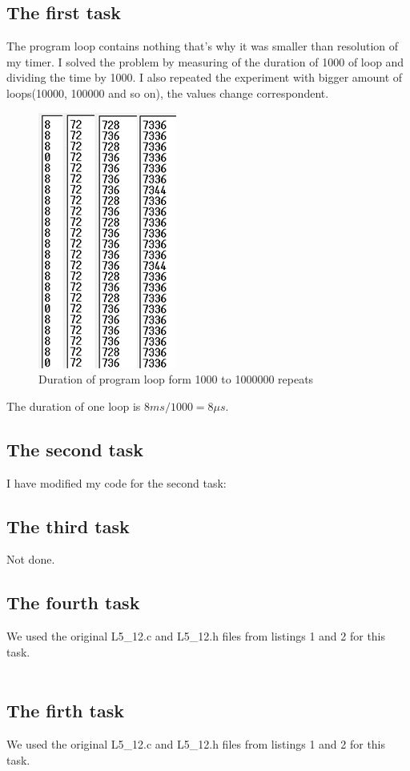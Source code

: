 \documentclass[english]{article}
\begin{document}
\subsection{The first task}


The program loop contains nothing that's why it was smaller than resolution of my timer. I solved the problem by measuring of the duration of 1000 of loop and dividing the time by 1000. I also repeated the experiment with bigger amount of loops(10000, 100000 and so on), the values change correspondent.
\begin{figure}[H]
\centerline{\includegraphics[scale=0.65]{MicroLab5/loops}}
\caption{Duration of program loop form 1000 to 1000000 repeats}
\end{figure}
The duration of one loop is $8ms/1000=8\mu s$.

\subsection{The second task}
I have modified my code for the second task:



\subsection{The third task}
Not done.
\subsection{The fourth task}
We used the original L5\_12.c and L5\_12.h files from listings 1 and 2 for this task.\\\\

\subsection{The firth task}
We used the original L5\_12.c and L5\_12.h files from listings 1 and 2 for this task.

\end{document}
